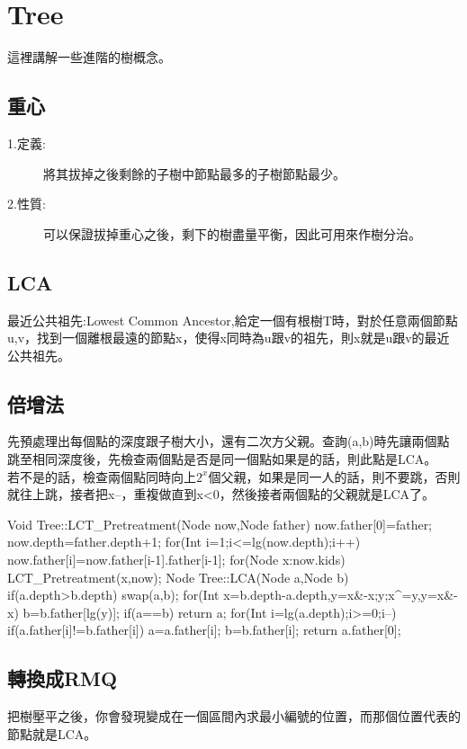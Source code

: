 \documentclass{article}
\begin{document}
\section{Tree}
這裡講解一些進階的樹概念。\\
\subsection{重心}
\begin{description}
\item[ 1.定義:]將其拔掉之後剩餘的子樹中節點最多的子樹節點最少。
\item[ 2.性質:]可以保證拔掉重心之後，剩下的樹盡量平衡，因此可用來作樹分治。
\end{description}
\subsection{LCA}
最近公共祖先:Lowest Common Ancestor,給定一個有根樹T時，對於任意兩個節點u,v，找到一個離根最遠的節點x，使得x同時為u跟v的祖先，則x就是u跟v的最近公共祖先。\\
\subsection{倍增法}
先預處理出每個點的深度跟子樹大小，還有二次方父親。查詢(a,b)時先讓兩個點跳至相同深度後，先檢查兩個點是否是同一個點如果是的話，則此點是LCA。\\
若不是的話，檢查兩個點同時向上$2^x$個父親，如果是同一人的話，則不要跳，否則就往上跳，接者把x--，重複做直到x<0，然後接者兩個點的父親就是LCA了。\\
\begin{algorithm}[caption={倍增法}, label={alg1}]
Void Tree::LCT_Pretreatment(Node now,Node father)
    now.father[0]=father;
    now.depth=father.depth+1;
    for(Int i=1;i<=lg(now.depth);i++)
        now.father[i]=now.father[i-1].father[i-1];
    for(Node x:now.kids)
        LCT_Pretreatment(x,now);
Node Tree::LCA(Node a,Node b)
    if(a.depth>b.depth)
        swap(a,b);
    for(Int x=b.depth-a.depth,y=x&-x;y;x^=y,y=x&-x)
        b=b.father[lg(y)];
    if(a==b)
        return a;
    for(Int i=lg(a.depth);i>=0;i--)
        if(a.father[i]!=b.father[i])
            a=a.father[i];
            b=b.father[i];
    return a.father[0];
\end{algorithm}
\subsection{轉換成RMQ}
把樹壓平之後，你會發現變成在一個區間內求最小編號的位置，而那個位置代表的節點就是LCA。\\
\end{document}
